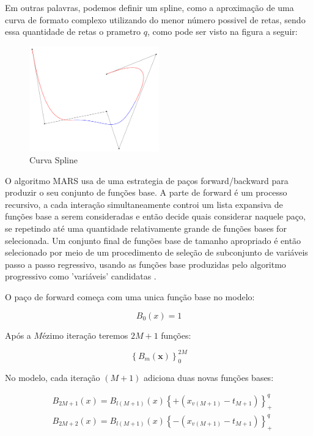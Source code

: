 \documentclass[
	12pt,				%
	openright,			%
	oneside,			%
	a4paper,			%
	english,			%
	brazil				%
	]{abntex2}
\begin{document}
Em outras palavras, podemos definir um spline, como a aproximação de uma curva de formato complexo utilizando do 
menor número possivel de retas, sendo essa quantidade de retas o prametro $q$, como pode ser visto na figura a seguir:

\begin{figure}[htb]
    \centering
    \caption{\label{Curva Spline}Curva Spline}
    \includegraphics[width=0.50\textwidth]{../Imgs/B-spline_curve.png}
\end{figure}

O algoritmo MARS usa de uma estrategia de paços forward/backward para produzir o seu conjunto de funções base. A parte de forward é um
processo recursivo, a cada interação simultaneamente controi um lista expansiva de funções base a serem consideradas e então decide quais
considerar naquele paço, se repetindo até uma quantidade relativamente grande de funções bases for selecionada. Um conjunto final de 
funções base de tamanho apropriado é então selecionado por meio de um procedimento de seleção de subconjunto de variáveis passo a passo 
regressivo, usando as funções base produzidas pelo algoritmo progressivo como 'variáveis' candidatas \cite{intro_mars}.

O paço de forward começa com uma unica função base no modelo:

\begin{equation}
	\label{inicio_funcao_base}
	B_0(x) = 1
\end{equation}

Após a $M$ézimo iteração teremos $2M+1$ funções:

\begin{equation}
	\label{funcao_base}
	\left\{B_m(\mathbf{x})\right\}_{0}^{2M}
\end{equation}

No modelo, cada iteração $(M + 1)$ adiciona duas novas funções bases:

\begin{equation}
	\label{novas_funcoes}
	\begin{split}
		& B_{2M+1}(x) = B_{l(M+1)}(x)\left\{+(x_{v(M+1)}-t_{M+1})\right\}_{+}^{q} \\
		& B_{2M+2}(x) = B_{l(M+1)}(x)\left\{-(x_{v(M+1)}-t_{M+1})\right\}_{+}^{q} \\
	\end{split}
\end{equation}
\end{document}
